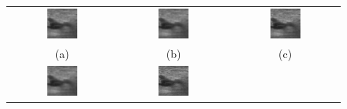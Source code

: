 {\begin{figure}[h]
	\centering
	\begin{tabular}{ccc}
		\includegraphics[width=0.3\textwidth]{bab4/citra-asli.jpg} &
		\includegraphics[width=0.3\textwidth]{bab4/citra-bilateral.jpg} &
		\includegraphics[width=0.3\textwidth]{bab4/citra-gaussian.jpg} \\
		(a)  & (b)  & (c)  \\ %
		\includegraphics[width=0.3\textwidth]{bab4/citra-mean.jpg} &
		\includegraphics[width=0.3\textwidth]{bab4/citra-median.jpg} &

\end{tabular}
\end{figure}}
